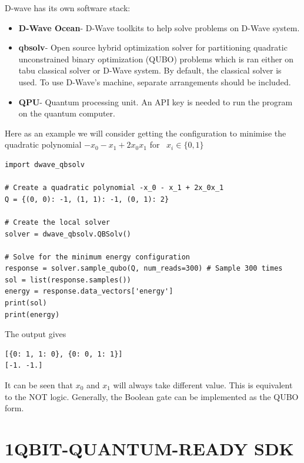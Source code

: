   D-wave has its own software stack:
  
\begin{itemize}
    \item \textbf{D-Wave Ocean}- D-Wave toolkits to help solve problems on D-Wave system.
     \item \textbf{qbsolv}- Open source hybrid optimization solver for partitioning quadratic unconstrained binary optimization (QUBO) problems which is ran either on tabu classical solver or D-Wave system. By default, the classical solver is used. To use D-Wave's machine, separate arrangements should be included.
    \item \textbf{QPU}- Quantum processing unit. An API key is needed to run the program on the quantum computer.
 \end{itemize}
Here as an example we will consider getting the configuration to minimise the quadratic polynomial $-x_0-x_1+2x_0x_1$ for \ $x_i\in\{0,1\}$  

\begin{verbatim}
import dwave_qbsolv

# Create a quadratic polynomial -x_0 - x_1 + 2x_0x_1 
Q = {(0, 0): -1, (1, 1): -1, (0, 1): 2}

# Create the local solver
solver = dwave_qbsolv.QBSolv()

# Solve for the minimum energy configuration
response = solver.sample_qubo(Q, num_reads=300) # Sample 300 times
sol = list(response.samples())
energy = response.data_vectors['energy']
print(sol)
print(energy)
\end{verbatim}
The output gives
\begin{verbatim}
[{0: 1, 1: 0}, {0: 0, 1: 1}]
[-1. -1.]
\end{verbatim}
It can be seen that $x_0$ and $x_1$ will always take different value. This is equivalent to the NOT logic. 
Generally, the Boolean gate can be implemented as the QUBO form. 

\section{1QBIT-QUANTUM-READY SDK}

